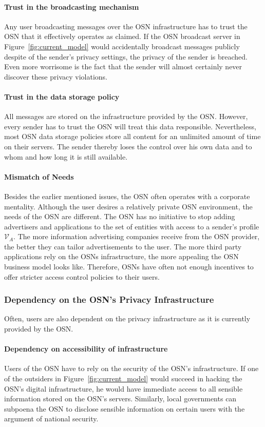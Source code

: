 \paragraph{Trust in the broadcasting mechanism} Any user broadcasting messages over the OSN infrastructure has to trust the OSN that it effectively operates as claimed. If the OSN broadcast server in Figure~\ref{fig:current_model} would accidentally broadcast messages publicly despite of the sender's privacy settings, the privacy of the sender is breached. Even more worrisome is the fact that the sender will almost certainly never discover these privacy violations.

\paragraph{Trust in the data storage policy} All messages are stored on the infrastructure provided by the OSN. However, every sender has to trust the OSN will treat this data responsible. Nevertheless, most OSN data storage policies store all content for an unlimited amount of time on their servers. The sender thereby loses the control over his own data and to whom and how long it is still available.

\paragraph{Mismatch of Needs} Besides the earlier mentioned issues, the OSN often operates with a corporate mentality. Although the user desires a relatively private OSN environment, the needs of the OSN are different. The OSN has no initiative to stop adding advertisers and applications to the set of entities with access to a sender's profile $\mathcal{V}_A$. The more information advertising companies receive from the OSN provider, the better they can tailor advertisements to the user. The more third party applications rely on the OSNs infrastructure, the more appealing the OSN business model looks like. Therefore, OSNs have often not enough incentives to offer stricter access control policies to their users.

\subsubsection{Dependency on the OSN's Privacy Infrastructure}
Often, users are also dependent on the privacy infrastructure as it is currently provided by the OSN.

\paragraph{Dependency on accessibility of infrastructure}
Users of the OSN have to rely on the security of the OSN's infrastructure. If one of the outsiders in Figure~\ref{fig:current_model} would succeed in hacking the OSN's digital infrastructure, he would have immediate access to all sensible information stored on the OSN's servers. Similarly, local governments can subpoena the OSN to disclose sensible information on certain users with the argument of national security.

